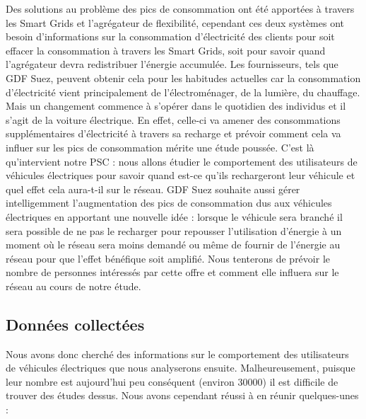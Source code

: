 			Des solutions au problème des pics de consommation ont été apportées à travers les Smart Grids et l’agrégateur de flexibilité, cependant ces deux systèmes ont besoin d’informations sur la consommation d’électricité des clients pour soit effacer la consommation à travers les Smart Grids, soit pour savoir quand l’agrégateur devra redistribuer l’énergie accumulée. Les fournisseurs, tels que GDF Suez, peuvent obtenir cela pour les habitudes actuelles car la consommation d’électricité vient principalement de l’électroménager, de la lumière, du chauffage. Mais un changement commence à s’opérer dans le quotidien des individus et il s’agit de la voiture électrique. En effet, celle-ci va amener des consommations supplémentaires d’électricité à travers sa recharge et prévoir comment cela va influer sur les pics de consommation mérite une étude poussée. C’est là qu’intervient notre PSC : nous allons étudier le comportement des utilisateurs de véhicules électriques pour savoir quand est-ce qu’ils rechargeront leur véhicule et quel effet cela aura-t-il sur le réseau. GDF Suez souhaite aussi gérer intelligemment l’augmentation des pics de consommation dus aux véhicules électriques en apportant une nouvelle idée : lorsque le véhicule sera branché il sera possible de ne pas le recharger pour repousser l’utilisation d’énergie à un moment où le réseau sera moins demandé ou même de fournir de l’énergie au réseau pour que l’effet bénéfique soit amplifié. Nous tenterons de prévoir le nombre de personnes intéressés par cette offre et comment elle influera sur le réseau au cours de notre étude.
			
			
	
	\subsection{Données collectées}
	
		Nous avons donc cherché des informations sur le comportement des utilisateurs de véhicules électriques que nous analyserons ensuite. Malheureusement, puisque leur nombre est aujourd’hui peu conséquent (environ 30000) il est difficile de trouver des études dessus. Nous avons cependant réussi à en réunir quelques-unes :
		

